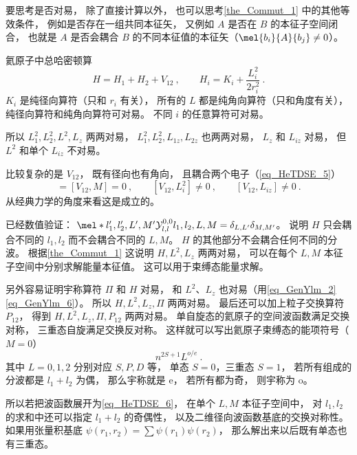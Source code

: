 
\begin{issues}
\issueDraft
\end{issues}

要思考是否对易， 除了直接计算以外， 也可以思考\autoref{the_Commut_1}  中的其他等效条件， 例如是否存在一组共同本征矢， 又例如 $A$ 是否在 $B$ 的本征子空间闭合， 也就是 $A$ 是否会耦合 $B$ 的不同本征值的本征矢（$\mel{b_i}{A}{b_j} \ne 0$）。

氦原子中总哈密顿算
\begin{equation}
H = H_1 + H_2 + V_{12}~,
\qquad H_i = K_i + \frac{L_i^2}{2r_i^2}~.
\end{equation}
$K_i$ 是纯径向算符（只和 $r_i$ 有关）， 所有的 $L$ 都是纯角向算符（只和角度有关）， 纯径向算符和纯角向算符可对易。 不同 $i$ 的任意算符可对易。

所以 $L_1^2, L_2^2, L^2, L_z$ 两两对易， $L_1^2, L_2^2, L_{1z}, L_{2z}$ 也两两对易， $L_z$ 和 $L_{iz}$ 对易， 但 $L^2$ 和单个 $L_{iz}$ 不对易。

比较复杂的是 $V_{12}$， 既有径向也有角向， 且耦合两个电子（\autoref{eq_HeTDSE_5}）
\begin{equation}
[V_{12}, L^2] = [V_{12}, M] = 0~,
\qquad
[V_{12}, L_i^2] \ne 0~,
\qquad
[V_{12}, L_{iz}] \ne 0~.
\end{equation}
从经典力学的角度来看这是成立的。

已经数值验证： $\mel*{l'_1,l'_2,L',M'}{\mathcal Y_{l,l}^{0,0}}{l_1,l_2,L,M} = \delta_{L,L'}\delta_{M,M'}$。 说明 $H$ 只会耦合不同的 $l_1,l_2$ 而不会耦合不同的 $L,M$。 $H$ 的其他部分不会耦合任何不同的分波。 根据\autoref{the_Commut_1}  这说明 $H,L^2,L_z$ 两两对易， 可以在每个 $L,M$ 本征子空间中分别求解能量本征值。 这可以用于束缚态能量求解。

另外容易证明宇称算符 $\Pi$ 和 $H$ 对易， 和 $L^2$、$L_z$ 也对易（用\autoref{eq_GenYlm_2} \autoref{eq_GenYlm_6}）。 所以 $H,L^2,L_z,\Pi$ 两两对易。 最后还可以加上粒子交换算符 $P_{12}$， 得到 $H,L^2,L_z,\Pi, P_{12}$ 两两对易。 单自旋态的氦原子的空间波函数满足交换对称， 三重态自旋满足交换反对称。 这样就可以写出氦原子束缚态的能项符号（$M=0$）
\begin{equation}
n^{2S+1}L^{o/e}~.
\end{equation}
其中 $L=0,1,2$ 分别对应 $S,P,D$ 等， 单态 $S=0$，三重态 $S=1$， 若所有组成的分波都是 $l_1+l_2$ 为偶， 那么宇称就是 e， 若所有都为奇， 则宇称为 o。

所以若把波函数展开为\autoref{eq_HeTDSE_6}， 在单个 $L,M$ 本征子空间中， 对 $l_1,l_2$ 的求和中还可以指定 $l_1+l_2$ 的奇偶性， 以及二维径向波函数基底的交换对称性。 如果用张量积基底 $\psi(r_1,r_2) = \sum \psi(r_1)\psi(r_2)$， 那么解出来以后既有单态也有三重态。
